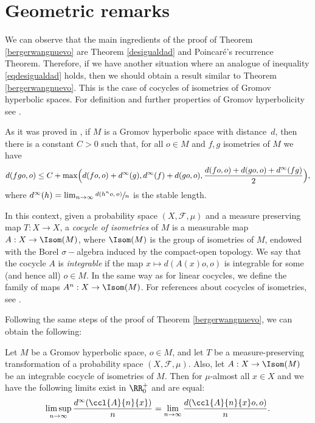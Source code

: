 \section{Geometric remarks}\label{seccionseis}

We can observe that the main ingredients of the proof of Theorem \ref{bergerwangnuevo} are Theorem \ref{desigualdad} and Poincaré's recurrence Theorem. Therefore, if we have another situation where an analogue of inequality \eqref{eqdesigualdad} holds, then we should obtain a result similar to Theorem \ref{bergerwangnuevo}. This is the case of cocycles of isometries of Gromov hyperbolic spaces. For definition and further properties of Gromov hyperbolicity see \cite{bri,papa,geodyn}.

As it was proved in \cite[Th.\,1.2]{yo}, if $M$ is a Gromov hyperbolic space with distance~$d$, then there is a constant $C>0$ such that, for all $o\in M$ and $f,g$ isometries of $M$ we have
\begin{equation*}
d(fgo,o)\leq C+\max \Bigl(d(fo,o)+d^{\infty}(g),d^{\infty}(f)+d(go,o),\frac{d(fo,o)+d(go,o)+d^{\infty}(fg)}{2}\Bigr),
\end{equation*}
where $d^{\infty}(h)=\lim_{n\to \infty}\sfrac{d(h^{n}o,o)}{n}$ is the stable length.

In this context, given a probability space $(X,\mathcal{F},\mu)$ and a measure preserving map $T:X\rightarrow X$, a \textit{cocycle of isometries} of $M$ is a measurable map $A:X\rightarrow \Isom(M)$, where $\Isom(M)$ is the group of isometries of $M$, endowed with the Borel $\sigma-$algebra induced by the compact-open topology. We say that the cocycle $A$ is \textit{integrable} if the map $x\mapsto d(A(x)o,o)$ is integrable for some (and hence all) $o \in M$. In the same way as for linear cocycles, we define the family of maps $A^{n}:X\rightarrow \Isom(M)$. For references about cocycles of isometries, see \eg \cite{goukar,karmar}.

Following the same steps of the proof of Theorem \ref{bergerwangnuevo}, we can obtain the following:

\begin{prop}\label{bewagromov}Let $M$ be a Gromov hyperbolic space, $o\in M$, and let $T$ be a measure-preserving transformation of a probability space $(X,\mathcal{F},\mu)$. Also, let $A: X \rightarrow \Isom(M)$ be an integrable cocycle of isometries of $M$. Then for $\mu$-almost all $x\in X$ and we have the following limits exist in $\RR^{+}_{0}$ and are equal:\vspace*{-3pt}\enlargethispage{\baselineskip}%
\begin{equation*}
\limsup_{n\to \infty}{\frac{d^{\infty}(\ccl{A}{n}{x})}{n}}=\lim_{n \to \infty}{\frac{d(\ccl{A}{n}{x}o,o)}{n}}.
\end{equation*}
\end{prop}

